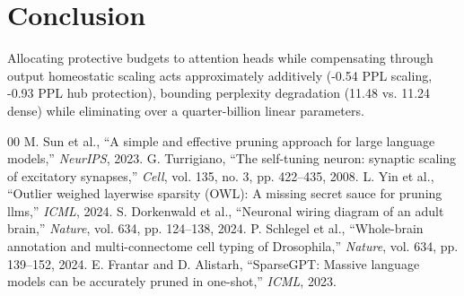 \documentclass[conference]{IEEEtran}
\begin{document}
\section{Conclusion}
Allocating protective budgets to attention heads while compensating through output homeostatic scaling acts approximately additively (-0.54 PPL scaling, -0.93 PPL hub protection), bounding perplexity degradation (11.48 vs. 11.24 dense) while eliminating over a quarter-billion linear parameters.

\begin{thebibliography}{00}
 M. Sun et al., ``A simple and effective pruning approach for large language models,'' \textit{NeurIPS}, 2023.
 G. Turrigiano, ``The self-tuning neuron: synaptic scaling of excitatory synapses,'' \textit{Cell}, vol. 135, no. 3, pp. 422--435, 2008.
 L. Yin et al., ``Outlier weighed layerwise sparsity (OWL): A missing secret sauce for pruning llms,'' \textit{ICML}, 2024.
 S. Dorkenwald et al., ``Neuronal wiring diagram of an adult brain,'' \textit{Nature}, vol. 634, pp. 124--138, 2024.
 P. Schlegel et al., ``Whole-brain annotation and multi-connectome cell typing of Drosophila,'' \textit{Nature}, vol. 634, pp. 139--152, 2024.
 E. Frantar and D. Alistarh, ``SparseGPT: Massive language models can be accurately pruned in one-shot,'' \textit{ICML}, 2023.
\end{thebibliography}
\end{document}
